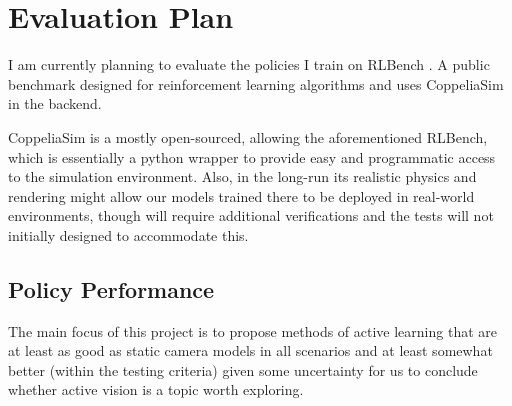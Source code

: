 \section{Evaluation Plan}
\label{sec:eval-plan}


I am currently planning to evaluate the policies I train on RLBench \cite{james2019rlbenchrobotlearningbenchmark}. A public benchmark designed for reinforcement learning algorithms and uses CoppeliaSim \cite{CoppeliaRobotics} in the backend.

CoppeliaSim is a mostly open-sourced, allowing the aforementioned RLBench, which is essentially a python wrapper to provide easy and programmatic access to the simulation environment. Also, in the long-run its realistic physics and rendering might allow our models trained there to be deployed in real-world environments, though will require additional verifications and the tests will not initially designed to accommodate this.

\subsection{Policy Performance}
The main focus of this project is to propose methods of active learning that are at least as good as static camera models in all scenarios and at least somewhat better (within the testing criteria) given some uncertainty for us to conclude whether active vision is a topic worth exploring.

